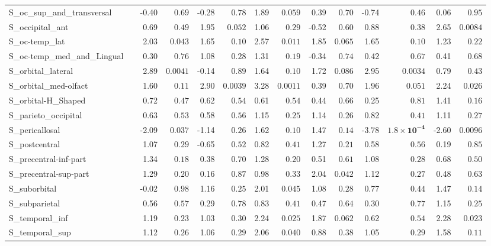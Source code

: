 {\begin{longtable}{llrrrrrrrrrrrr}
S\_oc\_sup\_and\_transversal &  & -0.40 & $0.69$ & -0.28 & $0.78$ & 1.89 & $0.059$ & 0.39 & $0.70$ & -0.74 & $0.46$ & 0.06 & $0.95$ \\
S\_occipital\_ant &  & 0.69 & $0.49$ & 1.95 & $0.052$ & 1.06 & $0.29$ & -0.52 & $0.60$ & 0.88 & $0.38$ & 2.65 & $0.0084$ \\
S\_oc-temp\_lat &  & 2.03 & $0.043$ & 1.65 & $0.10$ & 2.57 & $0.011$ & 1.85 & $0.065$ & 1.65 & $0.10$ & 1.23 & $0.22$ \\
S\_oc-temp\_med\_and\_Lingual &  & 0.30 & $0.76$ & 1.08 & $0.28$ & 1.31 & $0.19$ & -0.34 & $0.74$ & 0.42 & $0.67$ & 0.41 & $0.68$ \\
S\_orbital\_lateral &  & 2.89 & $0.0041$ & -0.14 & $0.89$ & 1.64 & $0.10$ & 1.72 & $0.086$ & 2.95 & $0.0034$ & 0.79 & $0.43$ \\
S\_orbital\_med-olfact &  & 1.60 & $0.11$ & 2.90 & $0.0039$ & 3.28 & $0.0011$ & 0.39 & $0.70$ & 1.96 & $0.051$ & 2.24 & $0.026$ \\
S\_orbital-H\_Shaped &  & 0.72 & $0.47$ & 0.62 & $0.54$ & 0.61 & $0.54$ & 0.44 & $0.66$ & 0.25 & $0.81$ & 1.41 & $0.16$ \\
S\_parieto\_occipital &  & 0.63 & $0.53$ & 0.58 & $0.56$ & 1.15 & $0.25$ & 1.14 & $0.26$ & 0.82 & $0.41$ & 1.11 & $0.27$ \\
S\_pericallosal &  & -2.09 & $0.037$ & -1.14 & $0.26$ & 1.62 & $0.10$ & 1.47 & $0.14$ & -3.78 & $\mathbf{1.8{\times}10^{-4}}$ & -2.60 & $0.0096$ \\
S\_postcentral &  & 1.07 & $0.29$ & -0.65 & $0.52$ & 0.82 & $0.41$ & 1.27 & $0.21$ & 0.58 & $0.56$ & 0.19 & $0.85$ \\
S\_precentral-inf-part &  & 1.34 & $0.18$ & 0.38 & $0.70$ & 1.28 & $0.20$ & 0.51 & $0.61$ & 1.08 & $0.28$ & 0.68 & $0.50$ \\
S\_precentral-sup-part &  & 1.29 & $0.20$ & 0.16 & $0.87$ & 0.98 & $0.33$ & 2.04 & $0.042$ & 1.12 & $0.27$ & 0.48 & $0.63$ \\
S\_suborbital &  & -0.02 & $0.98$ & 1.16 & $0.25$ & 2.01 & $0.045$ & 1.08 & $0.28$ & 0.77 & $0.44$ & 1.47 & $0.14$ \\
S\_subparietal &  & 0.56 & $0.57$ & 0.29 & $0.78$ & 0.83 & $0.41$ & 0.47 & $0.64$ & 0.30 & $0.77$ & 1.15 & $0.25$ \\
S\_temporal\_inf &  & 1.19 & $0.23$ & 1.03 & $0.30$ & 2.24 & $0.025$ & 1.87 & $0.062$ & 0.62 & $0.54$ & 2.28 & $0.023$ \\
S\_temporal\_sup &  & 1.12 & $0.26$ & 1.06 & $0.29$ & 2.06 & $0.040$ & 0.88 & $0.38$ & 1.05 & $0.29$ & 1.58 & $0.11$ \\

\end{longtable}}
